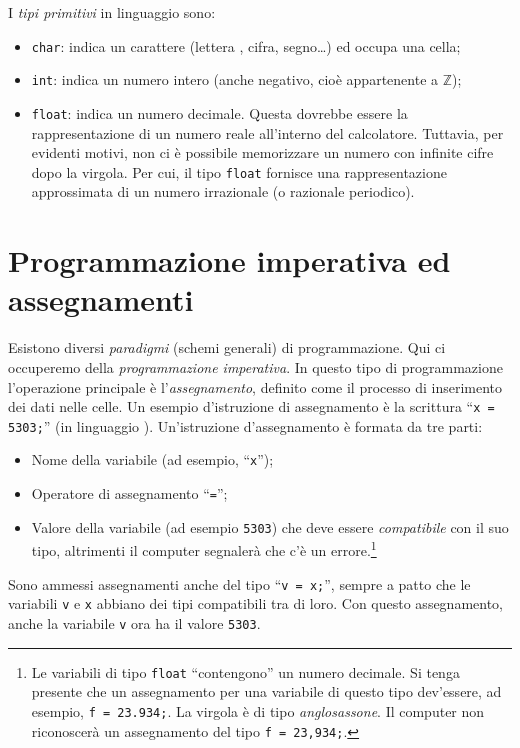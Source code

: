 I  \emph{tipi primitivi} in linguaggio  sono:
\begin{itemize}
	\item
\lstinline!char!: indica un carattere (lettera , cifra, segno…) ed occupa una cella;
	\item
\lstinline!int!: indica un numero intero (anche negativo, cioè appartenente a $\mathbb{Z}$);
	\item

\lstinline!float!: indica un numero decimale. Questa dovrebbe essere la rappresentazione di un numero reale all'interno del calcolatore. Tuttavia, per evidenti motivi, non ci è possibile memorizzare un numero con infinite cifre dopo la virgola. Per cui, il tipo \lstinline!float! fornisce una rappresentazione approssimata di un numero irrazionale (o razionale periodico).
\end{itemize}

	\section{Programmazione imperativa ed assegnamenti}
Esistono diversi \emph{paradigmi} (schemi generali) di programmazione.
Qui ci occuperemo della \emph{programmazione imperativa}.
In  questo tipo di programmazione l'operazione principale è l'\emph{assegnamento}, definito come il processo di inserimento dei dati nelle celle.
Un esempio d'istruzione di assegnamento è la scrittura ``\lstinline!x = 5303;!'' (in linguaggio ).
Un'istruzione d'assegnamento è formata da tre parti:
\begin{itemize}
	\item
Nome della variabile (ad esempio, ``\lstinline!x!'');
	\item
Operatore di assegnamento ``\lstinline!=!'';
	\item
Valore della variabile (ad esempio \lstinline!5303!) che deve essere \emph{compatibile} con il suo tipo, altrimenti il computer segnalerà che c'è un errore.\footnote{Le variabili di tipo \lstinline!float! ``contengono'' un numero decimale.
Si tenga presente che un assegnamento per una variabile di questo tipo dev'essere, ad esempio, \lstinline!f = 23.934;!.
La virgola è di tipo \emph{anglosassone}.
Il computer non riconoscerà un assegnamento del tipo \lstinline!f = 23,934;!.
}
\end{itemize}
Sono ammessi assegnamenti anche del tipo ``\lstinline!v = x;!'', sempre a patto che le variabili \lstinline!v! e \lstinline!x! abbiano dei tipi compatibili tra di loro.
Con questo assegnamento, anche la variabile \lstinline!v! ora ha il valore \lstinline!5303!.

